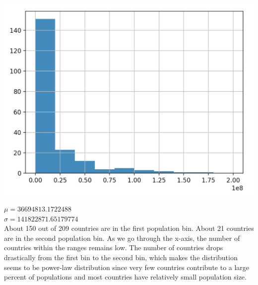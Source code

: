 \documentclass[12pt]{article}
\begin{document}
    \begin{center}
        \includegraphics[scale=0.6]{fig/p3.png}
    \end{center}
    $\mu = 36694813.1722488$\\
    $\sigma = 141822871.65179774$\\
    About 150 out of 209 countries are in the first population bin. About 21 countries are in the second population bin. As
    we go through the x-axis, the number of countries within the ranges remains low. The number of countries drops drastically
    from the first bin to the second bin, which makes the distribution seems to be power-law distribution since very few countries contribute to a large
    percent of populations and most countries have relatively small population size.
\end{document}
